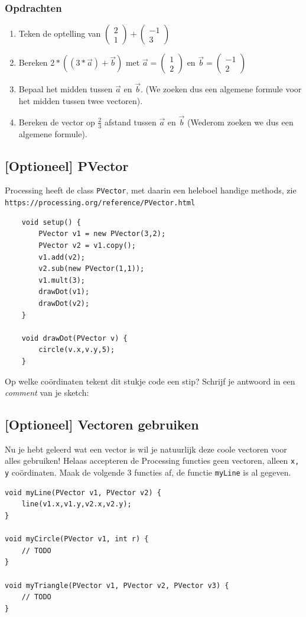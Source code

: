 \documentclass{../qh_exercise}
\begin{document}
\subsubsection{Opdrachten}
\begin{enumerate}
	\item Teken de optelling van $\begin{pmatrix}2\\1\end{pmatrix}+\begin{pmatrix}-1\\3\end{pmatrix}$
	\item Bereken $2*((3*\vec{a})+\vec{b})$ met $\vec{a}=\begin{pmatrix}1\\2\end{pmatrix}$ en $\vec{b} = \begin{pmatrix}-1\\2\end{pmatrix}$
	\item Bepaal het midden tussen $\vec{a}$ en $\vec{b}$. (We zoeken dus een algemene formule voor het midden tussen twee vectoren).
	\item Bereken de vector op $\frac{2}{3}$ afstand tussen $\vec{a}$ en $\vec{b}$ (Wederom zoeken we dus een algemene formule).
\end{enumerate}

\subsection{[Optioneel] PVector}
Processing heeft de class \texttt{PVector}, met daarin een heleboel handige methods, zie \texttt{https://processing.org/reference/PVector.html}
\begin{lstlisting}
	void setup() {
		PVector v1 = new PVector(3,2);
		PVector v2 = v1.copy();
		v1.add(v2);
		v2.sub(new PVector(1,1));
		v1.mult(3);
		drawDot(v1);
		drawDot(v2);
	}
	
	void drawDot(PVector v) {
		circle(v.x,v.y,5);
	}
\end{lstlisting}
Op welke co\"ordinaten tekent dit stukje code een stip?
Schrijf je antwoord in een \textit{comment} van je sketch:

\subsection{[Optioneel] Vectoren gebruiken}
Nu je hebt geleerd wat een vector is wil je natuurlijk deze coole vectoren voor alles gebruiken! Helaas accepteren de Processing functies geen vectoren, alleen \texttt{x, y} co\"ordinaten. Maak de volgende 3 functies af, de functie \texttt{myLine} is al gegeven.
\begin{lstlisting}
void myLine(PVector v1, PVector v2) {
    line(v1.x,v1.y,v2.x,v2.y);
}

void myCircle(PVector v1, int r) {
    // TODO
}

void myTriangle(PVector v1, PVector v2, PVector v3) {
    // TODO
}
\end{lstlisting}
\end{document}
